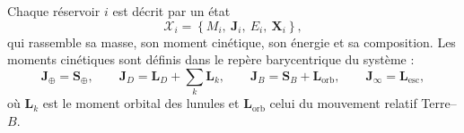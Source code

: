 \documentclass[11pt,a4paper,openany]{report}
\begin{document}
Chaque réservoir $i$ est décrit par un état
\begin{equation}
\mathcal{X}_i=\left\{M_i,\ \mathbf{J}_i,\ E_i,\ \mathbf{X}_i\right\},
\label{eq:etat-reservoir}
\end{equation}
qui rassemble sa masse, son moment cinétique, son énergie et sa composition. Les moments
cinétiques sont définis dans le repère barycentrique du système :
\begin{equation}
\mathbf{J}_\oplus=\mathbf{S}_\oplus,\qquad
\mathbf{J}_D=\mathbf{L}_D+\sum_k\mathbf{L}_k,\qquad
\mathbf{J}_B=\mathbf{S}_B+\mathbf{L}_{\mathrm{orb}},\qquad
\mathbf{J}_\infty=\mathbf{L}_{\mathrm{esc}},
\label{eq:J-reservoirs}
\end{equation}
où $\mathbf{L}_k$ est le moment orbital des lunules et $\mathbf{L}_{\mathrm{orb}}$ celui du
mouvement relatif Terre--$B$.
\end{document}
